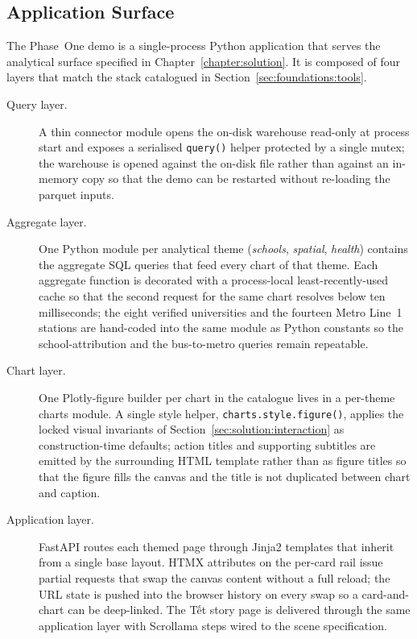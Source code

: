 \subsection{Application Surface}
\label{sec:impl:pipeline:app}

The Phase~One demo is a single-process Python application that serves
the analytical surface specified in Chapter~\ref{chapter:solution}. It
is composed of four layers that match the stack catalogued in
Section~\ref{sec:foundations:tools}.

\begin{description}
  \item[Query layer.] A thin connector module opens the on-disk
    warehouse read-only at process start and exposes a serialised
    \texttt{query()} helper protected by a single mutex; the warehouse
    is opened against the on-disk file rather than against an
    in-memory copy so that the demo can be restarted without
    re-loading the parquet inputs.

  \item[Aggregate layer.] One Python module per analytical theme
    (\emph{schools}, \emph{spatial}, \emph{health}) contains the
    aggregate SQL queries that feed every chart of that theme. Each
    aggregate function is decorated with a process-local
    least-recently-used cache so that the second request for the same
    chart resolves below ten milliseconds; the eight verified
    universities and the fourteen Metro Line~1 stations are hand-coded
    into the same module as Python constants so the school-attribution
    and the bus-to-metro queries remain repeatable.

  \item[Chart layer.] One Plotly-figure builder per chart in the
    catalogue lives in a per-theme charts module. A single style
    helper, \texttt{charts.style.figure()}, applies the locked visual
    invariants of Section~\ref{sec:solution:interaction} as
    construction-time defaults; action titles and supporting subtitles
    are emitted by the surrounding HTML template rather than as figure
    titles so that the figure fills the canvas and the title is not
    duplicated between chart and caption.

  \item[Application layer.] FastAPI \cite{fastapi} routes
    each themed page through Jinja2 \cite{jinja2} templates that
    inherit from a single base layout. HTMX \cite{htmx}
    attributes on the per-card rail issue partial requests that swap
    the canvas content without a full reload; the URL state is pushed
    into the browser history on every swap so a card-and-chart can be
    deep-linked. The Tết story page is delivered through the same
    application layer with Scrollama \cite{scrollama} steps wired to
    the scene specification.


\end{description}
